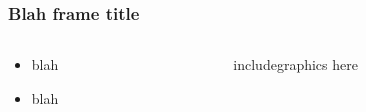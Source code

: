 

\begin{frame}
  \frametitle{Blah frame title}
  \begin{columns}
    \begin{column}{.4\textwidth}
      \begin{itemize}
      \item blah
      \item blah
      \end{itemize}
    \end{column}
    \begin{column}{.7\textwidth}
      \centering
      includegraphics here
    \end{column}
  \end{columns}
\end{frame}




